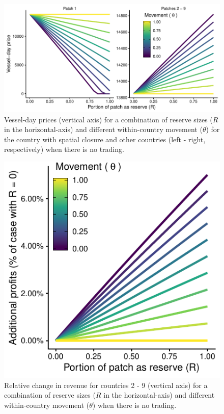 \documentclass[12pt]{article}
\begin{document}
\begin{figure}[htbp]
\centering
\includegraphics{img/vessel_day_price_no_trading_plot.pdf}
\caption{\label{fig:vessel_day_price_no_trading_plot}Vessel-day prices (vertical axis) for a combination of reserve sizes ($R$ in the horizontal-axis) and different within-country movement ($\theta$) for the country with spatial closure and other countries (left - right, respectively) when there is no trading.}
\end{figure}

\begin{figure}[htbp]
\centering
\includegraphics{img/profits_PNA_notKIR_no_trading_plot.pdf}
\caption{\label{fig:profits_PNA_notKIR_no_trading_plot}Relative change in revenue for countries 2 - 9 (vertical axis) for a combination of reserve sizes ($R$ in the horizontal-axis) and different within-country movement ($\theta$) when there is no trading.}
\end{figure}
\end{document}
